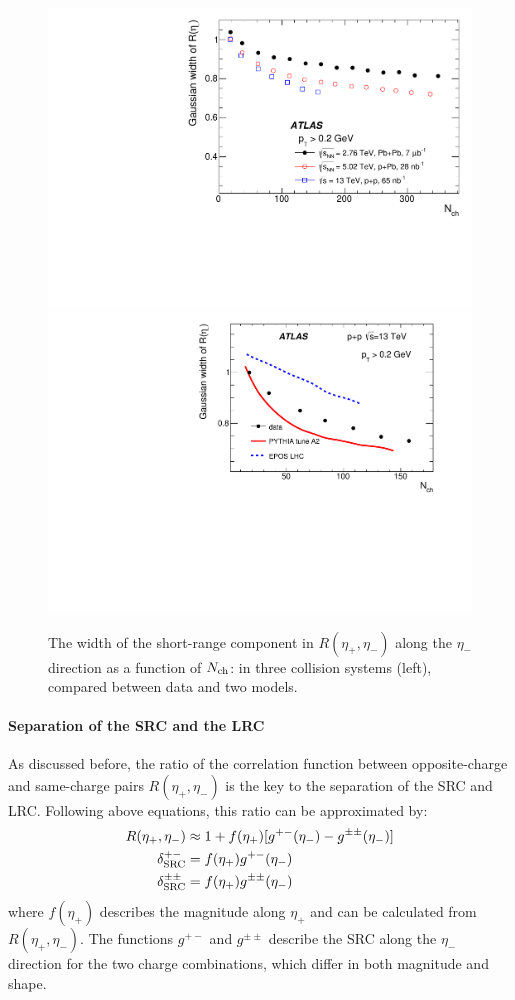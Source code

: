 \begin{figure}[H]
\centering
\includegraphics[width=.475\linewidth]{figs/chapter_fbcorr/ATLAS_SRCremoval_sysComp.pdf}
\includegraphics[width=.475\linewidth]{figs/chapter_fbcorr/ATLAS_SRCremoval_modelComp.pdf}
\caption{The width of the short-range component in $R(\eta_+, \eta_-)$ along the $\eta_-$ direction as a function of $N_\text{ch}$: in three collision systems (left), compared between data and two models.}
\label{fig:fbcorr_ATLAS_SRCremoval_sysComp}
\end{figure}



\paragraph{Separation of the SRC and the LRC}
\label{sec:separation_of_the_src_and_the_lrc}

As discussed before, the ratio of the correlation function between opposite-charge and same-charge pairs $R(\eta_+, \eta_-)$ is the key to the separation of the SRC and LRC. Following above equations, this ratio can be approximated by:
\begin{equation}
\begin{split}
R(\eta_+, \eta_-) &\approx 1 + f(\eta_+) [g^{+-}(\eta_-) - g^{\pm\pm}(\eta_-)] \\
\delta_\text{SRC}^{+-} &= f(\eta_+) g^{+-}(\eta_-) \\
\delta_\text{SRC}^{\pm\pm} &= f(\eta_+) g^{\pm\pm}(\eta_-)
\end{split}
\end{equation}
where $f(\eta_+)$ describes the magnitude along $\eta_+$ and can be calculated from $R(\eta_+, \eta_-)$. The functions $g^{+-}$ and $g^{\pm\pm}$ describe the SRC along the $\eta_-$ direction for the two charge combinations, which differ in both magnitude and shape.


